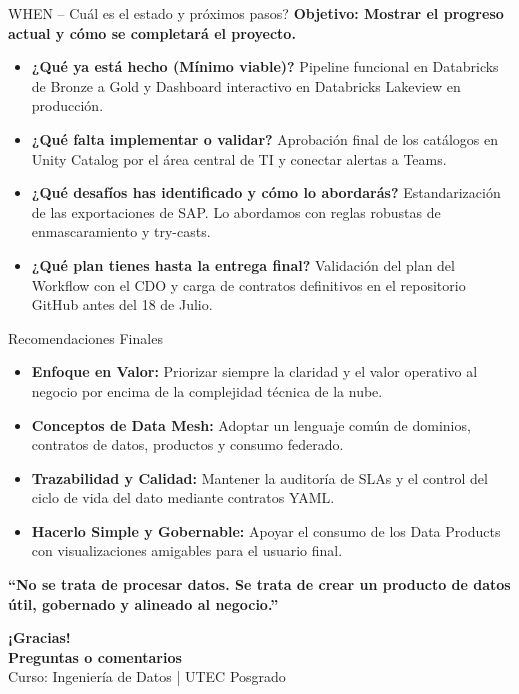 \documentclass[aspectratio=169,10pt]{beamer}
\begin{document}
\begin{frame}{WHEN -- Cuál es el estado y próximos pasos?}
    \textbf{Objetivo: Mostrar el progreso actual y cómo se completará el proyecto.}
    \vspace{0.4cm}
    \begin{itemize}
        \item \textbf{¿Qué ya está hecho (Mínimo viable)?}
          Pipeline funcional en Databricks de Bronze a Gold y Dashboard interactivo en Databricks Lakeview en producción.
        \item \textbf{¿Qué falta implementar o validar?}
          Aprobación final de los catálogos en Unity Catalog por el área central de TI y conectar alertas a Teams.
        \item \textbf{¿Qué desafíos has identificado y cómo lo abordarás?}
          Estandarización de las exportaciones de SAP. Lo abordamos con reglas robustas de enmascaramiento y try-casts.
        \item \textbf{¿Qué plan tienes hasta la entrega final?}
          Validación del plan del Workflow con el CDO y carga de contratos definitivos en el repositorio GitHub antes del 18 de Julio.
    \end{itemize}
\end{frame}

\begin{frame}{Recomendaciones Finales}
    \begin{itemize}
        \setlength{\itemsep}{0.6em}
        \item \textbf{Enfoque en Valor:} Priorizar siempre la claridad y el valor operativo al negocio por encima de la complejidad técnica de la nube.
        \item \textbf{Conceptos de Data Mesh:} Adoptar un lenguaje común de dominios, contratos de datos, productos y consumo federado.
        \item \textbf{Trazabilidad y Calidad:} Mantener la auditoría de SLAs y el control del ciclo de vida del dato mediante contratos YAML.
        \item \textbf{Hacerlo Simple y Gobernable:} Apoyar el consumo de los Data Products con visualizaciones amigables para el usuario final.
    \end{itemize}
    \vspace{0.3cm}
    \centering
    \small \textbf{“No se trata de procesar datos. Se trata de crear un producto de datos útil, gobernado y alineado al negocio.”}
\end{frame}

{
\begin{frame}[plain]
    \centering
    \vspace{2cm}
    {\Huge \color{UtecCyan} \textbf{¡Gracias!}} \\[0.8cm]
    \color{white!80}
    {\large \textbf{Preguntas o comentarios}} \\[1cm]
    \footnotesize
    \color{white!60}
    Curso: Ingeniería de Datos | UTEC Posgrado
\end{frame}
}
\end{document}
